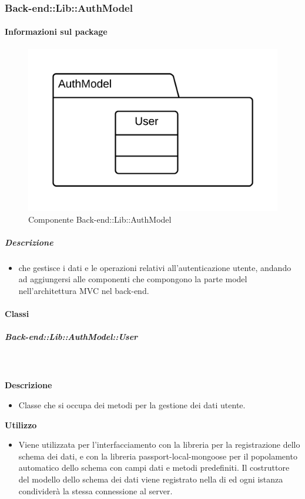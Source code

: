   \subsubsection{Back-end::Lib::AuthModel}
  \paragraph{Informazioni sul package} 
    \begin{figure}[H] 
      \begin{center} 
        \includegraphics[width=\textwidth]{packages/Back-end::Lib::AuthModel.png}  
        \caption{Componente Back-end::Lib::AuthModel}
      \end{center}  
    \end{figure} 
  \subparagraph{Descrizione} 
    \begin{itemize}
    \item[]  che gestisce i dati e le operazioni relativi all'autenticazione utente, andando ad aggiungersi alle componenti che compongono la parte model nell'architettura MVC nel back-end. 
    \end{itemize} 
    \paragraph{Classi}
      \subparagraph{Back-end::Lib::AuthModel::User}
        
        \textbf{\\ \\ Descrizione} 
          \begin{itemize}
            \item[] Classe che si occupa dei metodi per la gestione dei dati utente. 
          \end{itemize}      
        \textbf{Utilizzo}  
          \begin{itemize}
            \item[] Viene utilizzata per l'interfacciamento con la libreria  per la registrazione dello schema dei dati, e con la libreria passport-local-mongoose per il popolamento automatico dello schema con campi dati e metodi predefiniti.
Il costruttore del modello dello schema dei dati viene registrato nella  di  ed ogni istanza condividerà la stessa connessione al server.
          \end{itemize}
